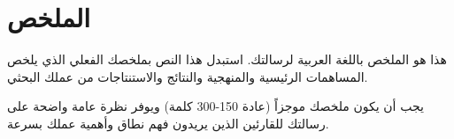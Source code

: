 \pagestyle{empty}

\chapter*{\arabicfont الملخص}


هذا هو الملخص باللغة العربية لرسالتك. استبدل هذا النص بملخصك الفعلي الذي يلخص المساهمات الرئيسية والمنهجية والنتائج والاستنتاجات من عملك البحثي.

يجب أن يكون ملخصك موجزاً (عادة 150-300 كلمة) ويوفر نظرة عامة واضحة على رسالتك للقارئين الذين يريدون فهم نطاق وأهمية عملك بسرعة.

\newpage
